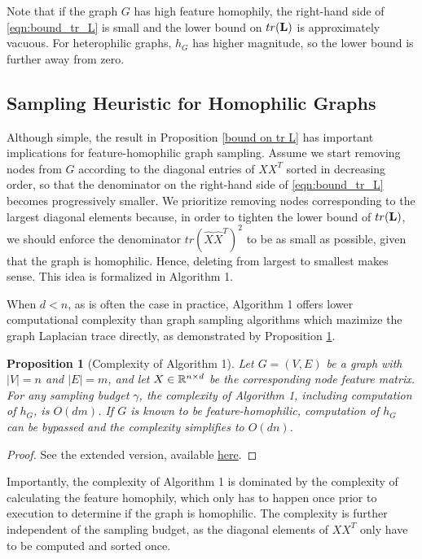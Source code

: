 \documentclass[conference]{IEEEtran}
\newtheorem{proposition}[theorem]{Proposition} %
\theoremstyle{definition}
\begin{document}
Note that if the graph $G$ has high feature homophily, the right-hand side of \eqref{eqn:bound_tr_L} is small and the lower bound on $tr({\mathbf L})$ is approximately vacuous. For heterophilic graphs, $h_G$ has higher magnitude, so the lower bound is further away from zero.

\subsection{Sampling Heuristic for Homophilic Graphs}

Although simple, the result in Proposition \ref{bound on tr L} has important implications for feature-homophilic graph sampling. Assume we start removing nodes from $G$ according to the diagonal entries of $X X^T$ sorted in decreasing order, so that the denominator on the right-hand side of \eqref{eqn:bound_tr_L} becomes progressively smaller. We prioritize removing nodes corresponding to the largest diagonal elements because, in order to tighten the lower bound of ${tr}({\mathbf L})$, we should enforce the denominator ${tr}(\hat{X}\hat{X}^T)^2$ to be as small as possible, given that the graph is homophilic. Hence, deleting from largest to smallest makes sense. This idea is formalized in Algorithm 1.

When $d<n$, as is often the case in practice, Algorithm 1 offers lower computational complexity than graph sampling algorithms which mazimize the graph Laplacian trace directly, as demonstrated by Proposition \ref{prop:complexity}.

\begin{proposition}[Complexity of Algorithm 1] \label{prop:complexity}
    Let $G=(V,E)$ be a graph with $|V|=n$ and $|E|=m$, and let $X \in {\mathbb R}^{n\times d}$ be the corresponding node feature matrix. For any sampling budget $\gamma$, the complexity of Algorithm 1, including computation of $h_G$, is $O(dm)$. If $G$ is known to be feature-homophilic, computation of $h_G$ can be bypassed and the complexity simplifies to $O(dn)$. 
\end{proposition}
\begin{proof}
See the extended version, available {\href{https://github.com/JamesLi128/Graph-Sampling-for-Scalable-and-Expressive-Graph-Neural-Networks-on-Homophilic-Graphs/blob/master/main.pdf}{here}}.
\end{proof}

Importantly, the complexity of Algorithm 1 is dominated by the complexity of calculating the feature homophily, which only has to happen once prior to execution to determine if the graph is homophilic. The complexity is further independent of the sampling budget, as the diagonal elements of $XX^T$ only have to be computed and sorted once. 
\end{document}
